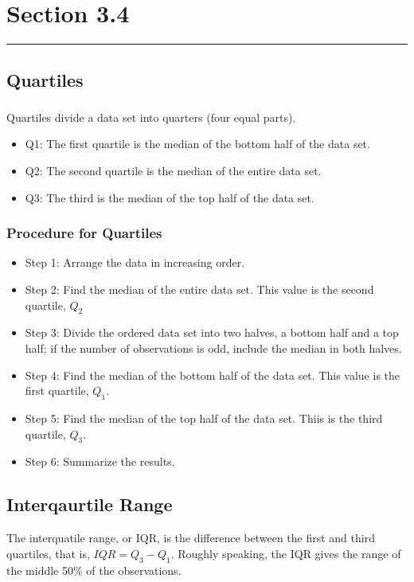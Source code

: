 \documentclass[12pt]{article}
\begin{document}
    \section*{Section 3.4}
    \noindent\rule{\textwidth}{0.4pt}
        \subsection*{Quartiles}
            \subsubsection*{}
                Quartiles divide a data set into quarters (four equal parts).
                \begin{itemize}
                    \item{Q1:} The first quartile is the median of the bottom half of the data set.
                    \item{Q2:} The second quartile is the median of the entire data set.
                    \item{Q3:} The third is the median of the top half of the data set.
                \end{itemize}
            \subsubsection*{Procedure for Quartiles}
                \begin{itemize}
                    \item{Step 1:} Arrange the data in increasing order.
                    \item{Step 2:} Find the median of the entire data set. This value is the second quartile, \(Q_2\)
                    \item{Step 3:} Divide the ordered data set into two halves, a bottom half and a top half;
                    if the number of observations is odd, include the median in both halves.
                    \item{Step 4:} Find the median of the bottom half of the data set. This value is the first quartile, \(Q_1\).
                    \item{Step 5:} Find the median of the top half of the data set. Thiis is the third quartile, \(Q_3\).
                    \item{Step 6:} Summarize the results.
                \end{itemize}
        \subsection*{Interqaurtile Range}
                The interquatile range, or IQR, is the difference between the first and third quartiles, that is, \(IQR = Q_3 - Q_1\).
                Roughly speaking, the IQR gives the range of the middle 50\% of the observations.
\end{document}
